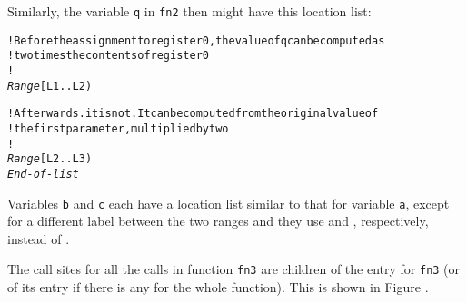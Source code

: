 \vspace*{0.7\baselineskip}
\condlinenumbers
Similarly, the variable \texttt{q} in \texttt{fn2} then might have this location list:
\par\nolinenumbers
\begin{dwflisting}
\begin{alltt}

    ! Before the assignment to register 0, the value of q can be computed as 
    ! two times the contents of register 0
    !
    \textit{Range} [L1 .. L2)
        \DWOPlittwo {} \DWOPmul \DWOPstackvalue

    ! Afterwards. it is not. It can be computed from the original value of 
    ! the first parameter, multiplied by two
    !
    \textit{Range} [L2 .. L3)
        \DWOPlittwo {} \DWOPregzero \DWOPmul \DWOPstackvalue
    \textit{End-of-list}

\end{alltt}
\end{dwflisting}

\vspace*{0.7\baselineskip}
\condlinenumbers
Variables \texttt{b} and \texttt{c} each have a location list similar to 
that for variable \texttt{a},
except for a different label between the two ranges and they
use \DWOPregone{} and \DWOPregtwo{}, respectively, instead of \DWOPregzero.


The call sites for all the calls in function \texttt{fn3} are children of the
\DWTAGsubprogram{} entry for \texttt{fn3} (or of its \DWTAGlexicalblock{} entry
if there is any for the whole function). 
This is shown in Figure .

